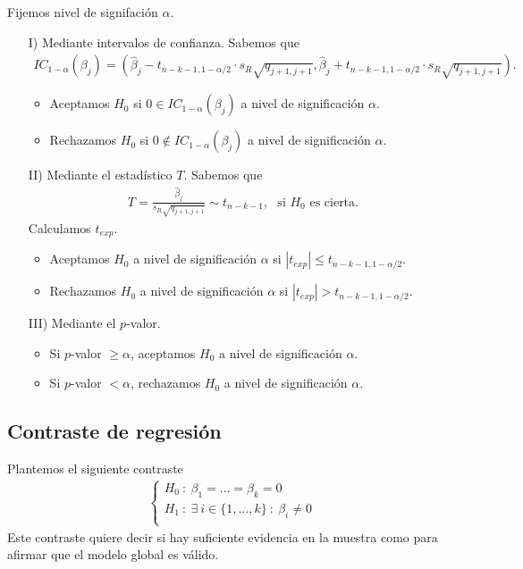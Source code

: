 Fijemos nivel de signifación $\alpha$.
\begin{enumerate}
    \item[I)] Mediante intervalos de confianza. Sabemos que
          \begin{align*}
              IC_{1-\alpha}(\beta_j) = \left( \widehat{\beta}_j - t_{n-k-1, 1 -\alpha/2} \cdot s_R \sqrt{q_{j+1,j+1}}, \widehat{\beta}_j + t_{n-k-1, 1 -\alpha/2} \cdot s_R \sqrt{q_{j+1,j+1}} \right).
          \end{align*}
          \begin{itemize}
              \item Aceptamos $H_0$ si $0 \in IC_{1-\alpha}(\beta_j)$ a nivel de significación $\alpha$.
              \item Rechazamos $H_0$ si $0 \not \in IC_{1-\alpha}(\beta_j)$ a nivel de significación $\alpha$.
          \end{itemize}
    \item[II)] Mediante el estadístico $T$. Sabemos que
          \begin{align*}
              T = \frac{\widehat{\beta}_j}{s_R\sqrt{q_{j+1,j+1}}} \sim t_{n-k-1}, \ \ \ \text{si $H_0$ es cierta}.
          \end{align*}
          Calculamos $t_{exp}$.
          \begin{itemize}
              \item Aceptamos $H_0$ a nivel de significación $\alpha$ si $|t_{exp}| \leq t_{n-k-1,1-\alpha/2}$.
              \item Rechazamos $H_0$ a nivel de significación $\alpha$ si $|t_{exp}| > t_{n-k-1,1-\alpha/2}$.
          \end{itemize}
    \item[III)] Mediante el $p$-valor.
          \begin{itemize}
              \item Si $p$-valor $\ge \alpha$, aceptamos $H_0$ a nivel de significación $\alpha$.
              \item Si $p$-valor $< \alpha$, rechazamos $H_0$ a nivel de significación $\alpha$.
          \end{itemize}
\end{enumerate}

\subsection{Contraste de regresión}
Plantemos el siguiente contraste
\begin{align*}
    \left\{ \begin{array}{lcc}
                H_0 \ : \ \beta_1 = \ldots = \beta_k = 0                        \\
                H_1 \ : \ \exists \ i \in \{1,\ldots,k\} \ : \ \beta_i \not = 0 \\
            \end{array}
    \right.
\end{align*}
Este contraste quiere decir si hay suficiente evidencia en la muestra como para afirmar que el modelo global es válido.

